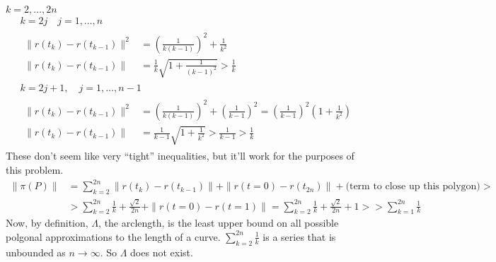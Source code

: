 \documentclass[twoside]{amsart}
\theoremstyle{plain}
\theoremstyle{definition}
\begin{document}
$k=2, \dots, 2n$
\[
\begin{aligned}
  & k = 2j \quad j = 1, \dots, n \\
  & \begin{aligned}
    \| r(t_k) - r(t_{k-1}) \|^2 & = \left( \frac{1}{ k (k-1)} \right)^2 + \frac{1}{k^2} \\
    \| r(t_k) - r(t_{k-1}) \| & = \frac{1}{k} \sqrt{ 1 + \frac{1}{ (k-1)^2} } > \frac{1}{k}
  \end{aligned} \\
  & k = 2j+1, \quad j = 1, \dots , n-1 \\
  & \begin{aligned}
    \| r(t_k) - r(t_{k-1}) \|^2 & = \left( \frac{1}{ k (k-1)} \right)^2 + \left( \frac{1}{k-1} \right)^2 = \left( \frac{1}{k-1} \right)^2 \left( 1 + \frac{1}{k^2} \right) \\
    \| r(t_k) - r(t_{k-1}) \| & = \frac{1}{k-1} \sqrt{ 1 + \frac{1}{k^2} } > \frac{1}{k-1} > \frac{1}{k}
\end{aligned} 
\end{aligned}
\]
These don't seem like very ``tight'' inequalities, but it'll work for the purposes of this problem.  
\[
\begin{aligned}
  \| \pi (P) \| & = \sum_{k=2}^{2n} \| r (t_k) - r(t_{k-1}) \| + \| r(t=0) - r(t_{2n}) \| + \text{(term to close up this polygon)} > \\
  & > \sum_{k=2}^{2n} \frac{1}{k} + \frac{\sqrt{2}}{2n} + \| r(t=0) - r(t=1) \| =  \sum_{k=2}^{2n} \frac{1}{k} + \frac{\sqrt{2}}{2n} + 1 > \boxed{ > \sum_{k=1}^{2n} \frac{1}{k} }
\end{aligned}
\]
Now, by definition, $\Lambda$, the arclength, is the least upper bound on all possible polgonal approximations to the length of a curve.  $\sum_{k=2}^{2n} \frac{1}{k}$ is a series that is unbounded as $n\to \infty$.  So $\Lambda$ does not exist.  

\end{document}
